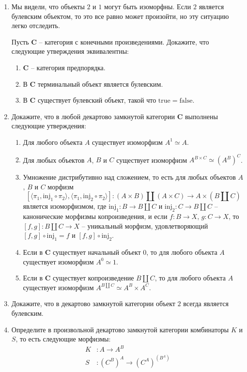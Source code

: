 \documentclass[draft]{article}
\newcommand{\cat}[1]{\mathbf{#1}}
\renewcommand{\C}{\cat{C}}
\newcommand{\true}{\mathrm{true}}
\newcommand{\false}{\mathrm{false}}
\newcommand{\inj}{\mathrm{inj}}
\begin{document}
\begin{enumerate}
\item Мы видели, что объекты $2$ и $1$ могут быть изоморфны. Если $2$ является булевским объектом, то это все равно может произойти, но эту ситуацию легко отследить.

Пусть $\C$ -- категория с конечными произведениями.
Докажите, что следующие утверждения эквивалентны:
\begin{enumerate}
\item $\C$ -- категория предпорядка.
\item В $\C$ терминальный объект является булевским.
\item В $\C$ существует булевский объект, такой что $\true = \false$.
\end{enumerate}

\item Докажите, что в любой декартово замкнутой категории $\C$ выполнены следующие утверждения:
\begin{enumerate}
\item Для любого объекта $A$ существует изоморфизм $A^1 \simeq A$.
\item Для любых объектов $A$, $B$ и $C$ существует изоморфизм $A^{B \times C} \simeq (A^B)^C$.
\item Умножение дистрибутивно над сложением, то есть для любых объектов $A$, $B$ и $C$ морфизм
\[ [\langle \pi_1, \inj_1 \circ \pi_2 \rangle, \langle \pi_1, \inj_2 \circ \pi_2 \rangle ] : (A \times B) \amalg (A \times C) \to A \times (B \amalg C) \]
является изоморфизмом, где $\inj_1 : B \to B \amalg C$ и $\inj_2 : C \to B \amalg C$ -- канонические морфизмы копроизведения, и
если $f : B \to X$, $g : C \to X$, то $[f,g] : B \amalg C \to X$ -- уникальный морфизм, удовлетворяющий $[f,g] \circ \inj_1 = f$ и $[f,g] \circ \inj_2$.
\item Если в $\C$ существует начальный объект 0, то для любого объекта $A$ существует изоморфизм $A^0 \simeq 1$.
\item Если в $\C$ существует копроизведение $B \amalg C$, то для любого объекта $A$ существует изоморфизм $A^{B \amalg C} \simeq A^B \times A^C$.
\end{enumerate}

\item Докажите, что в декартово замкнутой категории объект $2$ всегда является булевским.

\item Определите в произвольной декартово замкнутой категории комбинаторы $K$ и $S$, то есть следующие морфизмы:
\begin{align*}
K & : A \to A^B \\
S & : (C^B)^A \to (C^A)^{(B^A)}
\end{align*}


\end{enumerate}
\end{document}
